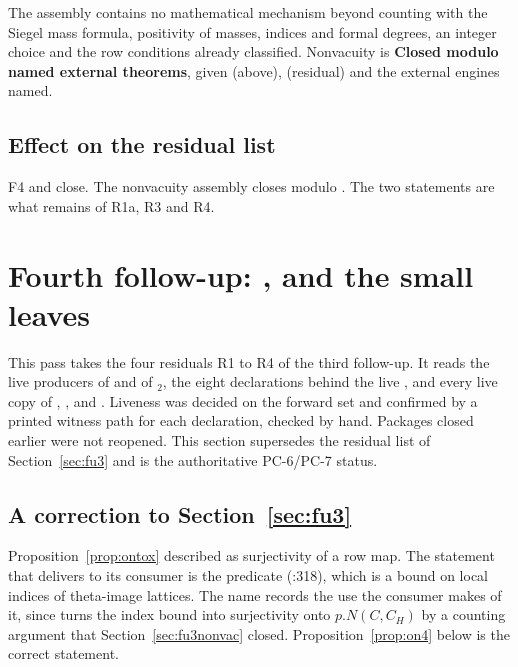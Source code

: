 \documentclass[11pt]{article}
\newcommand{\PC}[1]{\textsf{PC-#1}}
\newcommand{\sE}{\textbf{Closed modulo named external theorems}}
\theoremstyle{remark}
\begin{document}
\noindent The assembly contains no mathematical mechanism beyond counting with the Siegel mass formula, positivity of masses, indices and formal degrees, an integer choice and the row conditions already classified. Nonvacuity is \sE, given  (above),  (residual) and the external engines named.

\subsection{Effect on the residual list}

F4 and  close. The nonvacuity assembly closes modulo . The two  statements are what remains of R1a, R3 and R4.

\section{Fourth follow-up: ,  and the small leaves}\label{sec:fu4}

This pass takes the four residuals R1 to R4 of the third follow-up. It reads the live producers of  and of $_2$, the eight declarations behind the live , and every live copy of , ,  and . Liveness was decided on the forward set  and confirmed by a printed witness path for each declaration, checked by hand. Packages closed earlier were not reopened. This section supersedes the residual list of Section~\ref{sec:fu3} and is the authoritative \PC{6}/\PC{7} status.

\subsection{A correction to Section~\ref{sec:fu3}}

Proposition~\ref{prop:ontox} described  as surjectivity of a row map. The statement that  delivers to its consumer is the predicate  (:318), which is a bound on local indices of theta-image lattices. The name records the use the consumer makes of it, since  turns the index bound into surjectivity onto $p.N(C,C_H)$ by a counting argument that Section~\ref{sec:fu3nonvac} closed. Proposition~\ref{prop:on4} below is the correct statement.
\end{document}
